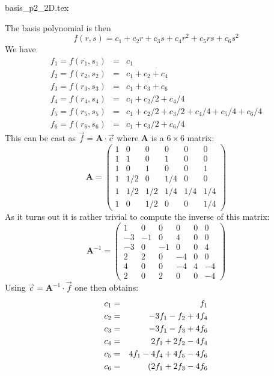 \begin{flushright} {\tiny {\color{gray} basis\_p2\_2D.tex}} \end{flushright}



The basis polynomial is then
\[
f(r,s) = c_1 + c_2 r + c_3 s + c_4  r^2 + c_5 rs  + c_6 s^2
\]
We have 
\begin{eqnarray}
f_1 = f(r_1,s_1) &=& c_1 \nonumber\\
f_2 = f(r_2,s_2) &=& c_1 + c_2 + c_4\nonumber\\
f_3 = f(r_3,s_3) &=& c_1 + c_3 + c_6\nonumber\\
f_4 = f(r_4,s_4) &=& c_1 + c_2/2 + c_4/4\nonumber\\
f_5 = f(r_5,s_5) &=& c_1 + c_2/2 + c_3/2  + c_4/4 + c_5/4 + c_6/4\nonumber\\
f_6 = f(r_6,s_6) &=& c_1 + c_3/2 + c_6/4\nonumber
\end{eqnarray}
This can be cast as $\vec{f}={\bm A}\cdot \vec{c}$ where ${\bm A}$ is a $6\times6$ matrix:
\[
{\bm A}=
\left(
\begin{array}{cccccc}
1&0   &  0  & 0   & 0   & 0\\
1&1   &  0  & 1   & 0   & 0\\
1&0   &  1  & 0   & 0   & 1\\
1&1/2 &  0  & 1/4 & 0   & 0\\
1&1/2 &  1/2& 1/4 & 1/4 & 1/4\\
1&0   &  1/2& 0   & 0   & 1/4
\end{array}
\right)
\]
As it turns out it is rather trivial to compute the inverse of this matrix:
\[
{\bm A}^{-1}=
\left(
\begin{array}{cccccc}
1  & 0 & 0  & 0  & 0 & 0  \\
-3 & -1& 0  & 4  & 0 & 0 \\
-3 & 0 & -1 & 0  & 0 & 4 \\
2  & 2 & 0  & -4 & 0 & 0  \\
4  & 0 & 0  & -4 & 4 & -4 \\
2  & 0 & 2  & 0  & 0 & -4
\end{array}
\right)
\]
Using $\vec{c}={\bm A}^{-1}\cdot \vec{f}$ one then obtains:
\begin{eqnarray}
c_1 &=& f_1 \nonumber\\
c_2 &=& -3f_1-f_2+4f_4\nonumber\\
c_3 &=& -3f_1-f_3+4f_6  \nonumber\\
c_4 &=& 2f_1+2f_2-4f_4 \nonumber\\
c_5 &=& 4f_1-4f_4+4f_5-4f_6 \nonumber\\
c_6 &=& (2f_1+2f_3-4f_6 \nonumber
\end{eqnarray}
